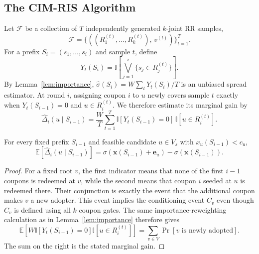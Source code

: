 \documentclass[sigconf,balance=false]{acmart}
\newcommand{\CIMRIS}{\textsc{CIM-RIS}}
\newcommand{\E}{\mathbb{E}}
\newcommand{\I}{\mathbb{I}}
\begin{document}
\subsection{The \CIMRIS{} Algorithm}

Let $\mathcal{F}$ be a collection of $T$ independently generated
$k$-joint RR samples,
\[
  \mathcal{F} =
  \{((R_1^{(t)},\ldots,R_k^{(t)}),\,v^{(t)})\}_{t=1}^T.
\]
For a prefix $S_i=(s_1,\ldots,s_i)$ and sample $t$, define
\[
  Y_t(S_i)=
  \I\!\left[\bigvee_{j=1}^{i}\{s_j\in R_j^{(t)}\}\right].
\]
By Lemma~\ref{lem:importance},
$\hat{\sigma}(S_i)=W\sum_tY_t(S_i)/T$ is an unbiased spread estimator.
At round $i$, assigning coupon $i$ to $u$ newly covers sample $t$ exactly
when $Y_t(S_{i-1})=0$ and $u\in R_i^{(t)}$.
We therefore estimate its marginal gain by
\[
  \widehat{\Delta}_i(u\mid S_{i-1})
  =\frac{W}{T}\sum_{t=1}^{T}
    \I[Y_t(S_{i-1})=0]\,\I[u\in R_i^{(t)}].
\]

\begin{lemma}
\label{lem:marginal}
For every fixed prefix $S_{i-1}$ and feasible candidate
$u\in V_s$ with $x_u(S_{i-1})<c_u$,
\[
  \E[\widehat{\Delta}_i(u\mid S_{i-1})]
  =\sigma(\bm{x}(S_{i-1})+\bm{e}_u)
   -\sigma(\bm{x}(S_{i-1})).
\]
\end{lemma}

\begin{proof}
For a fixed root $v$, the first indicator means that none of the first
$i-1$ coupons is redeemed at $v$, while the second means that coupon $i$
seeded at $u$ is redeemed there.
Their conjunction is exactly the event that the additional coupon makes
$v$ a new adopter. This event implies the conditioning event $C_v$ even
though $C_v$ is defined using all $k$ coupon gates.
The same importance-reweighting calculation as in
Lemma~\ref{lem:importance} therefore gives
\[
  \E\!\left[W\I[Y_t(S_{i-1})=0]\I[u\in R_i^{(t)}]\right]
  =\sum_{v\in V}\Pr[v\text{ is newly adopted}].
\]
The sum on the right is the stated marginal gain.
\end{proof}
\end{document}
